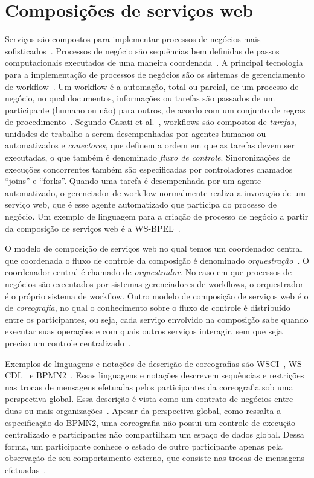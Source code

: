 \section{Composições de serviços web}
\label{sec:composicoes}

Serviços são compostos para implementar processos de negócios mais sofisticados~\cite{Papazoglou2007State}. Processos de negócio são sequências bem definidas de passos computacionais executados de uma maneira coordenada~\cite{Alonso2002Atomicity}. A principal tecnologia para a implementação de processos de negócios são os sistemas de gerenciamento de workflow~\cite{Agostini2000Improving}. Um workflow é a automação, total ou parcial, de um processo de negócio, no qual documentos, informações ou tarefas são passados de um participante (humano ou não) para outros, de acordo com um conjunto de regras de procedimento~\cite{WorkflowCoalition1999}. Segundo Casati et al.~\cite{Casati1998Workflow}, workflows são compostos de \emph{tarefas}, unidades de trabalho a serem desempenhadas por agentes humanos ou automatizados e \emph{conectores}, que definem a ordem em que as tarefas devem ser executadas, o que também é denominado \emph{fluxo de controle}. Sincronizações de execuções concorrentes também são especificadas por controladores chamados ``joins'' e ``forks''. Quando uma tarefa é desempenhada por um agente automatizado, o gerenciador de workflow normalmente realiza a invocação de um serviço web, que é esse agente automatizado que participa do processo de negócio. Um exemplo de linguagem para a criação de processo de negócio a partir da composição de serviços web é a WS-BPEL~\cite{BPEL2007}.

O modelo de composição de serviços web no qual temos um coordenador central que coordenada o fluxo de controle da composição é denominado \emph{orquestração}~\cite{Nanda2004Decentralizing}. O coordenador central é chamado de \emph{orquestrador}. No caso em que processos de negócios são executados por sistemas gerenciadores de workflows, o orquestrador é o próprio sistema de workflow. Outro modelo de composição de serviços web é o de \emph{coreografia}, no qual o conhecimento sobre o fluxo de controle é distribuído entre os participantes, ou seja, cada serviço envolvido na composição sabe quando executar suas operações e com quais outros serviços interagir, sem que seja preciso um controle centralizado~\cite{Barker2009Choreographing}. 

Exemplos de linguagens e notações de descrição de coreografias são WSCI~\cite{WSCI2002}, WS-CDL~\cite{WSCDL2005} e BPMN2~\cite{BPMN2011}. Essas linguagens e notações descrevem sequências e restrições nas trocas de mensagens efetuadas pelos participantes da coreografia sob uma perspectiva global. Essa descrição é vista como um contrato de negócios entre duas ou mais organizações~\cite{BPMN2011}. Apesar da perspectiva global, como ressalta a especificação do BPMN2, uma coreografia não possui um controle de execução centralizado e participantes não compartilham um espaço de dados global. Dessa forma, um participante conhece o estado de outro participante apenas pela observação de seu comportamento externo, que consiste nas trocas de mensagens efetuadas~\cite{BPMN2011}.

